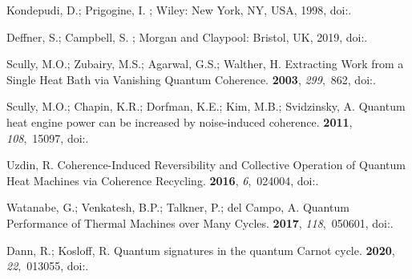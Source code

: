 \documentclass[preprints,article,accept,moreauthors,pdftex]{Definitions/mdpi}
\begin{document}
\begin{thebibliography}{999}

Kondepudi, D.; Prigogine, I.
; Wiley: New York, NY, USA, 1998,
\newblock
  doi:{\href{https://doi.org/10.1002/9781118698723}{}}.

Deffner, S.; Campbell, S.
; Morgan and Claypool: Bristol, UK, 2019,
\newblock
  doi:{\href{https://doi.org/10.1088/2053-2571/ab21c6}{}}.

Scully, M.O.; Zubairy, M.S.; Agarwal, G.S.; Walther, H.
\newblock Extracting Work from a Single Heat Bath via Vanishing Quantum
  Coherence.
 {\bf 2003}, {\em 299},~862,
\newblock
  doi:{\href{https://doi.org/10.1126/science.1078955}{}}.

Scully, M.O.; Chapin, K.R.; Dorfman, K.E.; Kim, M.B.; Svidzinsky, A.
\newblock Quantum heat engine power can be increased by noise-induced
  coherence.
 {\bf 2011}, {\em 108},~15097,
\newblock
  doi:{\href{https://doi.org/10.1073/pnas.1110234108}{}}.

Uzdin, R.
\newblock Coherence-Induced Reversibility and Collective Operation of Quantum
  Heat Machines via Coherence Recycling.
 {\bf 2016}, {\em 6},~024004,
\newblock
  doi:{\href{https://doi.org/10.1103/PhysRevApplied.6.024004}{}}.

Watanabe, G.; Venkatesh, B.P.; Talkner, P.; del Campo, A.
\newblock Quantum Performance of Thermal Machines over Many Cycles.
 {\bf 2017}, {\em 118},~050601,
\newblock
  doi:{\href{https://doi.org/10.1103/PhysRevLett.118.050601}{}}.

Dann, R.; Kosloff, R.
\newblock Quantum signatures in the quantum {C}arnot cycle.
 {\bf 2020}, {\em 22},~013055,
\newblock
  doi:{\href{https://doi.org/10.1088/1367-2630/ab6876}{}}.


\end{thebibliography}
\end{document}
